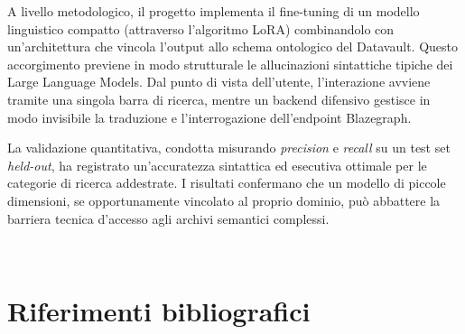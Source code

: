 \documentclass[12pt,a4paper,oneside]{book}
\begin{document}
A livello metodologico, il progetto implementa il fine-tuning di un modello linguistico compatto (attraverso l'algoritmo LoRA) combinandolo con un'architettura che vincola l'output allo schema ontologico del Datavault. Questo accorgimento previene in modo strutturale le allucinazioni sintattiche tipiche dei Large Language Models. Dal punto di vista dell'utente, l'interazione avviene tramite una singola barra di ricerca, mentre un backend difensivo gestisce in modo invisibile la traduzione e l'interrogazione dell'endpoint Blazegraph.

La validazione quantitativa, condotta misurando \textit{precision} e \textit{recall} su un test set \textit{held-out}, ha registrato un'accuratezza sintattica ed esecutiva ottimale per le categorie di ricerca addestrate. I risultati confermano che un modello di piccole dimensioni, se opportunamente vincolato al proprio dominio, può abbattere la barriera tecnica d'accesso agli archivi semantici complessi.



\topmargin=-1cm
\tableofcontents
\thispagestyle{empty}

\clearpage
\pagestyle{empty}
\begingroup
\let\clearpage\relax
\let\cleardoublepage\relax
\let\newpage\relax

\listoffigures
\listoftables
\lstlistoflistings\endgroup

\newpage~\newpage



\setcounter{page}{1}
\raggedbottom\pagestyle{plain}



\setcounter{chapter}{0}  %














\renewcommand{\bibsection}{}
\chapter*{Riferimenti bibliografici}
\nocite{*}

\newpage



\end{document}
